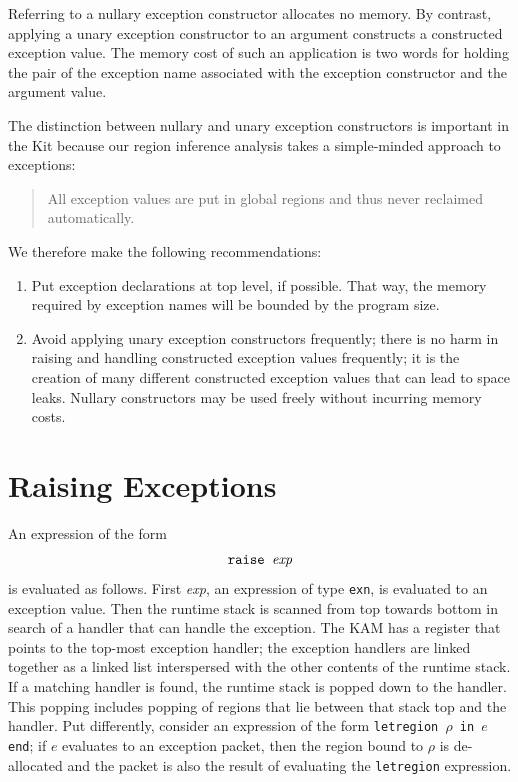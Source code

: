 \documentclass[12pt]{book}
\begin{document}
Referring to a nullary exception constructor allocates no memory. By
contrast, applying a unary exception constructor to an argument
constructs a constructed exception value. The memory cost of such an
application is two words for holding the pair of the exception name
associated with the exception constructor and the argument value.

The distinction between nullary and unary exception constructors
is important in the Kit because our region inference analysis
takes a simple-minded approach to exceptions: 
\begin{quote}
  All exception values are put in
  global regions and thus never reclaimed automatically.
\end{quote}
We therefore make the following recommendations:
\begin{enumerate}
\item Put exception declarations at top level, if possible.
      That way, the memory required by exception names will
       be bounded by the program size.
\item Avoid applying unary exception constructors frequently; there is
      no harm in raising and handling constructed exception values frequently;
      it is the creation of many different constructed exception values
      that can lead to space leaks. Nullary
      constructors may be used freely without incurring memory costs.
\end{enumerate}

\section{Raising Exceptions}
An expression of the form 
$$\hbox{\tt raise {\it exp}}$$
is evaluated as follows. First {\it exp}, an expression of 
type {\tt exn}, is evaluated to an exception value. Then the runtime
stack is scanned from top towards bottom in search of a handler
that can handle the exception. The KAM has a register that points
to the top-most exception handler; the exception handlers are linked
together as a linked list interspersed with the other contents of
the runtime stack. If a matching handler is found, the runtime stack
is popped down to the handler. This popping includes popping of regions
that lie between that stack top and the handler. Put differently,
consider an expression of the form 
{\tt letregion $\rho$ in $e$ end}; if $e$ evaluates to an exception packet,
then the region bound to $\rho$ is de-allocated and the packet is also
the result of evaluating the \texttt{letregion} expression.
\end{document}
